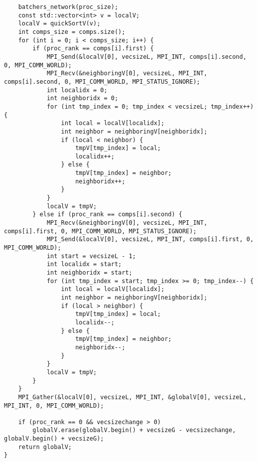 \documentclass{report}
\begin{document}
\begin{lstlisting}
    batchers_network(proc_size);
    const std::vector<int> v = localV;
    localV = quickSortV(v);
    int comps_size = comps.size();
    for (int i = 0; i < comps_size; i++) {
        if (proc_rank == comps[i].first) {
            MPI_Send(&localV[0], vecsizeL, MPI_INT, comps[i].second, 0, MPI_COMM_WORLD);
            MPI_Recv(&neighboringV[0], vecsizeL, MPI_INT, comps[i].second, 0, MPI_COMM_WORLD, MPI_STATUS_IGNORE);
            int localidx = 0;
            int neighboridx = 0;
            for (int tmp_index = 0; tmp_index < vecsizeL; tmp_index++) {
                int local = localV[localidx];
                int neighbor = neighboringV[neighboridx];
                if (local < neighbor) {
                    tmpV[tmp_index] = local;
                    localidx++;
                } else {
                    tmpV[tmp_index] = neighbor;
                    neighboridx++;
                }
            }
            localV = tmpV;
        } else if (proc_rank == comps[i].second) {
            MPI_Recv(&neighboringV[0], vecsizeL, MPI_INT, comps[i].first, 0, MPI_COMM_WORLD, MPI_STATUS_IGNORE);
            MPI_Send(&localV[0], vecsizeL, MPI_INT, comps[i].first, 0, MPI_COMM_WORLD);
            int start = vecsizeL - 1;
            int localidx = start;
            int neighboridx = start;
            for (int tmp_index = start; tmp_index >= 0; tmp_index--) {
                int local = localV[localidx];
                int neighbor = neighboringV[neighboridx];
                if (local > neighbor) {
                    tmpV[tmp_index] = local;
                    localidx--;
                } else {
                    tmpV[tmp_index] = neighbor;
                    neighboridx--;
                }
            }
            localV = tmpV;
        }
    }
    MPI_Gather(&localV[0], vecsizeL, MPI_INT, &globalV[0], vecsizeL, MPI_INT, 0, MPI_COMM_WORLD);

    if (proc_rank == 0 && vecsizechange > 0)
        globalV.erase(globalV.begin() + vecsizeG - vecsizechange, globalV.begin() + vecsizeG);
    return globalV;
}

\end{lstlisting}
\end{document}
